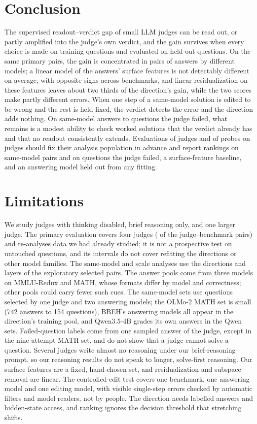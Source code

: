 \documentclass[11pt]{article}
\begin{document}
\section{Conclusion}

The supervised readout--verdict gap of small LLM judges can be read out, or partly amplified into the judge's own verdict, and the gain survives when every choice is made on training questions and evaluated on held-out questions. On the same primary pairs, the gain is concentrated in pairs of answers by different models; a linear model of the answers' surface features is not detectably different on average, with opposite signs across benchmarks, and linear residualization on these features leaves about two thirds of the direction's gain, while the two scores make partly different errors. When one step of a same-model solution is edited to be wrong and the rest is held fixed, the verdict detects the error and the direction adds nothing.
On same-model answers to questions the judge failed, what remains is a modest ability to check worked solutions that the verdict already has and that no readout consistently extends. Evaluations of judges and of probes on judges should fix their analysis population in advance and report rankings on same-model pairs and on questions the judge failed, a surface-feature baseline, and an answering model held out from any fitting.

\section*{Limitations}

We study judges with thinking disabled, brief reasoning only, and one larger judge. The primary evaluation covers four judges ( of the  judge--benchmark pairs) and re-analyses data we had already studied; it is not a prospective test on untouched questions, and its intervals do not cover refitting the directions or other model families. The same-model and scale analyses use the directions and layers of the exploratory selected pairs. The answer pools come from three models on MMLU-Redux and MATH, whose formats differ by model and correctness; other pools could carry fewer such cues. The same-model sets use questions selected by one judge and two answering models; the OLMo-2 MATH set is small (742 answers to 154 questions), BBEH's answering models all appear in the direction's training pool, and Qwen3.5-4B grades its own answers in the Qwen sets. Failed-question labels come from one sampled answer of the judge, except in the nine-attempt MATH set, and do not show that a judge cannot solve a question. Several judges write almost no reasoning under our brief-reasoning prompt, so our reasoning results do not speak to longer, solve-first reasoning. Our surface features are a fixed, hand-chosen set, and residualization and subspace removal are linear. The controlled-edit test covers one benchmark, one answering model and one editing model, with visible single-step errors checked by automatic filters and model readers, not by people.
The direction needs labelled answers and hidden-state access, and ranking ignores the decision threshold that stretching shifts.
\end{document}
